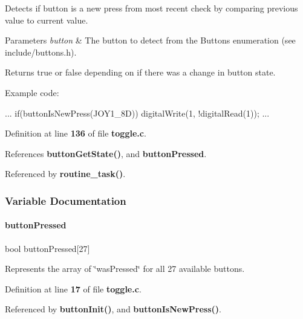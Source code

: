Detects if button is a new press from most recent check by comparing previous value to current value. 


\begin{DoxyParams}{Parameters}
{\em button} & The button to detect from the Buttons enumeration (see include/buttons.\+h).\\
\hline
\end{DoxyParams}
\begin{DoxyReturn}{Returns}
true or false depending on if there was a change in button state.
\end{DoxyReturn}
Example code\+: 
\begin{DoxyCode}
...
if(buttonIsNewPress(JOY1_8D))
    digitalWrite(1, !digitalRead(1));
...
\end{DoxyCode}
 

Definition at line \textbf{ 136} of file \textbf{ toggle.\+c}.



References \textbf{ button\+Get\+State()}, and \textbf{ button\+Pressed}.



Referenced by \textbf{ routine\+\_\+task()}.



\subsubsection{Variable Documentation}
\mbox{\label{toggle_8c_a66c983ca3b3f041a4e293f814a41198f}} 
\paragraph{button\+Pressed}
{\footnotesize\ttfamily bool button\+Pressed[27]}

Represents the array of \char`\"{}was\+Pressed\char`\"{} for all 27 available buttons. 

Definition at line \textbf{ 17} of file \textbf{ toggle.\+c}.



Referenced by \textbf{ button\+Init()}, and \textbf{ button\+Is\+New\+Press()}.

